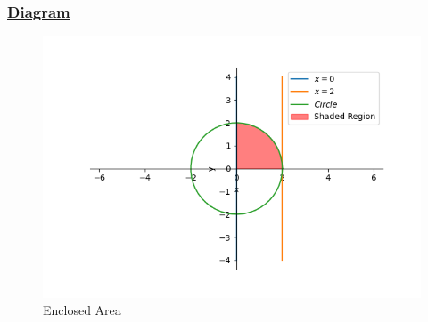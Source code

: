 \documentclass{beamer}
\theoremstyle{remark}
\numberwithin{equation}{section}
\begin{document}
\begin{frame}
	\frametitle{\underline{Diagram}}
	\begin{figure}[H]
		\centering
		\includegraphics[width=0.7\linewidth]{figs/Figure_1.png}
		\caption{Enclosed Area}
	\end{figure}
\end{frame}
\end{document}
